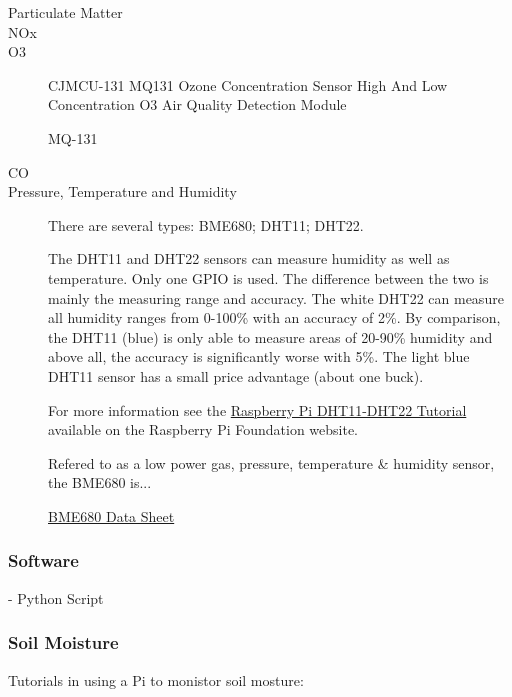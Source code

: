 \documentclass{article}\usepackage[]{graphicx}\usepackage[]{color}
\begin{document}
\begin{description}

\item[Particulate Matter]

\item[NOx]

\item[O3]

CJMCU-131 MQ131 Ozone Concentration Sensor High And Low Concentration O3 Air Quality Detection Module 

MQ-131

\item[CO]

\item[Pressure, Temperature and Humidity]

There are several types: BME680; DHT11; DHT22.


The DHT11 and DHT22 sensors can measure humidity as well as temperature. Only one GPIO is used. The difference between the two is mainly the measuring range and accuracy. The white DHT22 can measure all humidity ranges from 0-100\% with an accuracy of 2\%. By comparison, the DHT11 (blue) is only able to measure areas of 20-90\% humidity and above all, the accuracy is significantly worse with 5\%. The light blue DHT11 sensor has a small price advantage (about one buck).

For more information see the \href{https://tutorials-raspberrypi.com/raspberry-pi-measure-humidity-temperature-dht11-dht22/}{Raspberry Pi DHT11-DHT22 Tutorial} available on the Raspberry Pi Foundation website.

Refered to as a low power gas, pressure, temperature \& humidity sensor, the BME680 is...

\href{https://cdn-shop.adafruit.com/product-files/3660/BME680.pdf}{BME680 Data Sheet}

\end{description}

\subsubsection{Software}

- Python Script

\subsubsection{Soil Moisture}

Tutorials in using a Pi to monistor soil mosture:
\end{document}
